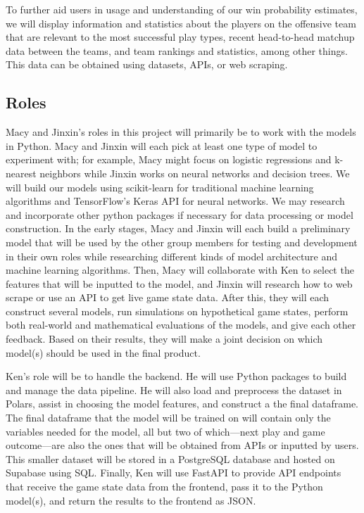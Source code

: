 \documentclass[conference]{IEEEtran}
\begin{document}
To further aid users in usage and understanding of our win probability
estimates, we will display information and statistics about the players on the
offensive team that are relevant to the most successful play types, recent
head-to-head matchup data between the teams, and team rankings and statistics,
among other things. This data can be obtained using datasets, APIs, or web
scraping.

\subsection{Roles}

Macy and Jinxin's roles in this project will primarily be to work with the
models in Python. Macy and Jinxin will each pick at least one type of model to
experiment with; for example, Macy might focus on logistic regressions and
k-nearest neighbors while Jinxin works on neural networks and decision trees.
We will build our models using scikit-learn for traditional machine learning
algorithms and TensorFlow's Keras API for neural networks. We may research and
incorporate other python packages if necessary for data processing or model
construction. In the early stages, Macy and Jinxin will each build a
preliminary model that will be used by the other group members for testing and
development in their own roles while researching different kinds of model
architecture and machine learning algorithms. Then, Macy will collaborate with
Ken to select the features that will be inputted to the model, and Jinxin will
research how to web scrape or use an API to get live game state data. After
this, they will each construct several models, run simulations on hypothetical
game states, perform both real-world and mathematical evaluations of the
models, and give each other feedback. Based on their results, they will make a
joint decision on which model(s) should be used in the final product.

Ken's role will be to handle the backend. He will use Python packages to build
and manage the data pipeline. He will also load and preprocess the dataset in
Polars, assist in choosing the model features, and construct a the final
dataframe. The final dataframe that the model will be trained on will contain
only the variables needed for the model, all but two of which---next play and
game outcome---are also the ones that will be obtained from APIs or inputted by
users. This smaller dataset will be stored in a PostgreSQL database and hosted
on Supabase using SQL. Finally, Ken will use FastAPI to provide API endpoints
that receive the game state data from the frontend, pass it to the Python
model(s), and return the results to the frontend as JSON.
\end{document}
